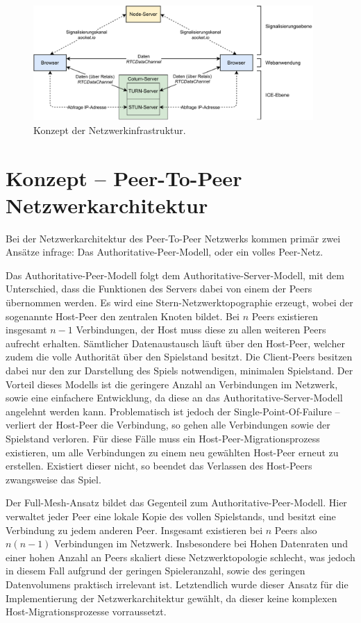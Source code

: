 \begin{figure}[h]
\centering
\includegraphics[width=0.95\textwidth]{bilder/PDF_SVG/NETWORK_STRUCTURE.pdf}
\caption{Konzept der Netzwerkinfrastruktur.}
\label{fig:networkstructure}
\end{figure}

\section{Konzept -- Peer-To-Peer Netzwerkarchitektur}
Bei der Netzwerkarchitektur des Peer-To-Peer Netzwerks kommen primär zwei Ansätze infrage: Das Authoritative-Peer-Modell, oder ein volles Peer-Netz.\par 

Das Authoritative-Peer-Modell folgt dem Authoritative-Server-Modell, mit dem Unterschied, dass die Funktionen des Servers dabei von einem der Peers übernommen werden. Es wird eine Stern-Netzwerktopographie erzeugt, wobei der sogenannte \glqq{}Host-Peer\grqq{} den zentralen Knoten bildet. Bei $n$ Peers existieren insgesamt $n-1$ Verbindungen, der Host muss diese zu allen weiteren Peers aufrecht erhalten. Sämtlicher Datenaustausch läuft über den Host-Peer, welcher zudem die volle Authorität über den Spielstand besitzt. Die Client-Peers besitzen dabei nur den zur Darstellung des Spiels notwendigen, minimalen Spielstand. Der Vorteil dieses Modells ist die geringere Anzahl an Verbindungen im Netzwerk, sowie eine einfachere Entwicklung, da diese an das Authoritative-Server-Modell angelehnt werden kann. Problematisch ist jedoch der Single-Point-Of-Failure -- verliert der Host-Peer die Verbindung, so gehen alle Verbindungen sowie der Spielstand verloren. Für diese Fälle muss ein \glqq{}Host-Peer-Migrationsprozess\grqq{} existieren, um alle Verbindungen zu einem neu gewählten Host-Peer erneut zu erstellen. Existiert dieser nicht, so beendet das Verlassen des Host-Peers zwangsweise das Spiel.\par

Der Full-Mesh-Ansatz bildet das Gegenteil zum Authoritative-Peer-Modell. Hier verwaltet jeder Peer eine lokale Kopie des vollen Spielstands, und besitzt eine Verbindung zu jedem anderen Peer. Insgesamt existieren bei $n$ Peers also $n(n-1)$ Verbindungen im Netzwerk. Insbesondere bei Hohen Datenraten und einer hohen Anzahl an Peers skaliert diese Netzwerktopologie schlecht, was jedoch in diesem Fall aufgrund der geringen Spieleranzahl, sowie des geringen Datenvolumens praktisch irrelevant ist. Letztendlich wurde dieser Ansatz für die Implementierung der Netzwerkarchitektur gewählt, da dieser keine komplexen Host-Migrationsprozesse vorraussetzt.\par

